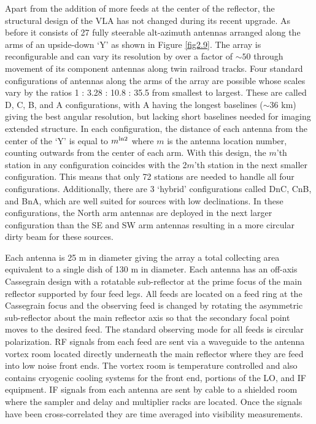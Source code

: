 Apart from the addition of more feeds at the center of the reflector, the structural design of the VLA has not changed during its recent upgrade. As before it consists of 27 fully steerable alt-azimuth antennas arranged along the arms of an upside-down `Y' as shown in Figure \ref{fig2.9}.  The array is reconfigurable and can vary its resolution by over a factor of $\sim 50$ through movement of its component antennas along twin railroad tracks. Four standard configurations of antennas along the arms of the array are possible whose scales vary by the ratios 1 : 3.28 : 10.8 : 35.5 from smallest to largest. These are called D, C, B, and A configurations, with A having the longest baselines ($\sim 36$ km) giving the best angular resolution, but lacking short baselines needed for imaging extended structure. In each configuration, the distance of each antenna from the center of the `Y' is equal to $m^{\rm{ln}2}$ where $m$ is the antenna location number, counting outwards from the center of each arm. With this design, the $m$'th station in any configuration coincides with the 2$m$'th station in the next smaller configuration. This means that only 72 stations are needed to handle all four configurations. Additionally, there are 3 `hybrid' configurations called DnC, CnB, and BnA, which are well suited for sources with low declinations. In these configurations, the North arm antennas are deployed in the next larger configuration than the SE and SW arm antennas resulting in a more circular dirty beam for these sources.

Each antenna is 25 m in diameter giving the array a total collecting area equivalent to a single dish of 130 m in diameter. Each antenna has an off-axis Cassegrain design with a rotatable sub-reflector at the prime focus of the main reflector supported by four feed legs. All feeds are located on a feed ring at the Cassegrain focus and the observing feed is changed by rotating the asymmetric sub-reflector about the main reflector axis so that the secondary focal point moves to the desired feed. The standard observing mode for all feeds is circular polarization. RF signals from each feed  are sent via a waveguide to the antenna vortex room located directly underneath the main reflector where they are feed into low noise front ends. The vortex room is temperature controlled and also contains cryogenic cooling systems for the front end, portions of the LO, and IF equipment. IF signals from each antenna are sent by cable to a shielded room where the sampler and delay and multiplier racks are located. Once the signals have been cross-correlated they are time averaged into visibility measurements.

